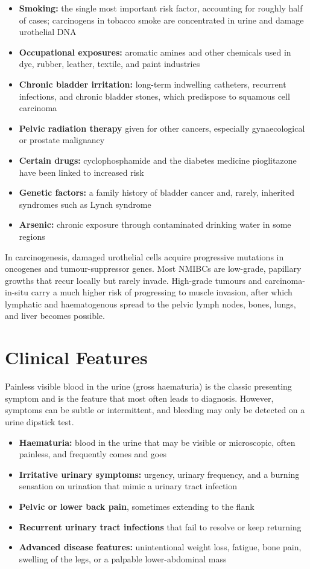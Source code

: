 \begin{itemize}
    \item \textbf{Smoking:} the single most important risk factor, accounting for roughly half of cases; carcinogens in tobacco smoke are concentrated in urine and damage urothelial DNA
    \item \textbf{Occupational exposures:} aromatic amines and other chemicals used in dye, rubber, leather, textile, and paint industries
    \item \textbf{Chronic bladder irritation:} long-term indwelling catheters, recurrent infections, and chronic bladder stones, which predispose to squamous cell carcinoma
    \item \textbf{Pelvic radiation therapy} given for other cancers, especially gynaecological or prostate malignancy
    \item \textbf{Certain drugs:} cyclophosphamide and the diabetes medicine pioglitazone have been linked to increased risk
    \item \textbf{Genetic factors:} a family history of bladder cancer and, rarely, inherited syndromes such as Lynch syndrome
    \item \textbf{Arsenic:} chronic exposure through contaminated drinking water in some regions
\end{itemize}

In carcinogenesis, damaged urothelial cells acquire progressive mutations in oncogenes and tumour-suppressor genes. Most NMIBCs are low-grade, papillary growths that recur locally but rarely invade. High-grade tumours and carcinoma-in-situ carry a much higher risk of progressing to muscle invasion, after which lymphatic and haematogenous spread to the pelvic lymph nodes, bones, lungs, and liver becomes possible.

\section*{Clinical Features}
Painless visible blood in the urine (gross haematuria) is the classic presenting symptom and is the feature that most often leads to diagnosis. However, symptoms can be subtle or intermittent, and bleeding may only be detected on a urine dipstick test.

\begin{itemize}
    \item \textbf{Haematuria:} blood in the urine that may be visible or microscopic, often painless, and frequently comes and goes
    \item \textbf{Irritative urinary symptoms:} urgency, urinary frequency, and a burning sensation on urination that mimic a urinary tract infection
    \item \textbf{Pelvic or lower back pain}, sometimes extending to the flank
    \item \textbf{Recurrent urinary tract infections} that fail to resolve or keep returning
    \item \textbf{Advanced disease features:} unintentional weight loss, fatigue, bone pain, swelling of the legs, or a palpable lower-abdominal mass
\end{itemize}

